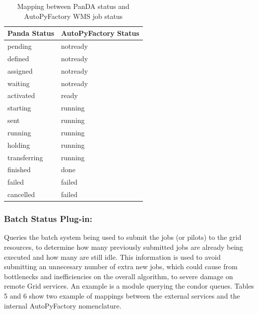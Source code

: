 \documentclass[a4paper]{jpconf}
\begin{document}
\begin{table}[h]
   \begin{center}
      \begin{tabular}{l l}
         \hline
         \textbf{Panda Status} & \textbf{AutoPyFactory Status}       \\
         \hline
         pending       & notready  \\ 
         defined       & notready  \\ 
         assigned      & notready  \\ 
         waiting       & notready  \\ 
         activated     & ready     \\ 
         starting      & running   \\ 
         sent          & running   \\ 
         running       & running   \\ 
         holding       & running   \\ 
         transferring  & running   \\ 
         finished      & done      \\ 
         failed        & failed    \\ 
         cancelled     & failed    \\ 
         \hline
      \end{tabular}
   \end{center}
   \caption{Mapping between PanDA status and AutoPyFactory WMS job status}
   \label{translation}
\end{table}


\subsubsection{Batch Status Plug-in:}
Queries the batch system being used to submit the jobs (or pilots) to the grid resources,
to determine how many previously submitted jobs are already being executed and how many are still idle.
This information is used to avoid submitting an unnecesary number of extra new jobs, 
which could cause from bottlenecks and inefficiencies on the overall algorithm, to severe damage on remote Grid services.
An example is a module querying the condor queues.
Tables 5 and 6 show two example of mappings between the external services
and the internal AutoPyFactory nomenclature.
\end{document}
